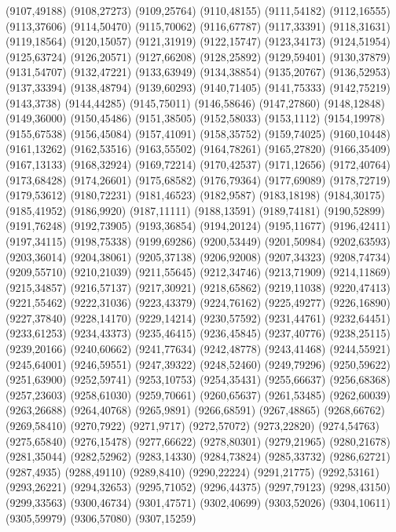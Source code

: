 (9107,49188)
(9108,27273)
(9109,25764)
(9110,48155)
(9111,54182)
(9112,16555)
(9113,37606)
(9114,50470)
(9115,70062)
(9116,67787)
(9117,33391)
(9118,31631)
(9119,18564)
(9120,15057)
(9121,31919)
(9122,15747)
(9123,34173)
(9124,51954)
(9125,63724)
(9126,20571)
(9127,66208)
(9128,25892)
(9129,59401)
(9130,37879)
(9131,54707)
(9132,47221)
(9133,63949)
(9134,38854)
(9135,20767)
(9136,52953)
(9137,33394)
(9138,48794)
(9139,60293)
(9140,71405)
(9141,75333)
(9142,75219)
(9143,3738)
(9144,44285)
(9145,75011)
(9146,58646)
(9147,27860)
(9148,12848)
(9149,36000)
(9150,45486)
(9151,38505)
(9152,58033)
(9153,1112)
(9154,19978)
(9155,67538)
(9156,45084)
(9157,41091)
(9158,35752)
(9159,74025)
(9160,10448)
(9161,13262)
(9162,53516)
(9163,55502)
(9164,78261)
(9165,27820)
(9166,35409)
(9167,13133)
(9168,32924)
(9169,72214)
(9170,42537)
(9171,12656)
(9172,40764)
(9173,68428)
(9174,26601)
(9175,68582)
(9176,79364)
(9177,69089)
(9178,72719)
(9179,53612)
(9180,72231)
(9181,46523)
(9182,9587)
(9183,18198)
(9184,30175)
(9185,41952)
(9186,9920)
(9187,11111)
(9188,13591)
(9189,74181)
(9190,52899)
(9191,76248)
(9192,73905)
(9193,36854)
(9194,20124)
(9195,11677)
(9196,42411)
(9197,34115)
(9198,75338)
(9199,69286)
(9200,53449)
(9201,50984)
(9202,63593)
(9203,36014)
(9204,38061)
(9205,37138)
(9206,92008)
(9207,34323)
(9208,74734)
(9209,55710)
(9210,21039)
(9211,55645)
(9212,34746)
(9213,71909)
(9214,11869)
(9215,34857)
(9216,57137)
(9217,30921)
(9218,65862)
(9219,11038)
(9220,47413)
(9221,55462)
(9222,31036)
(9223,43379)
(9224,76162)
(9225,49277)
(9226,16890)
(9227,37840)
(9228,14170)
(9229,14214)
(9230,57592)
(9231,44761)
(9232,64451)
(9233,61253)
(9234,43373)
(9235,46415)
(9236,45845)
(9237,40776)
(9238,25115)
(9239,20166)
(9240,60662)
(9241,77634)
(9242,48778)
(9243,41468)
(9244,55921)
(9245,64001)
(9246,59551)
(9247,39322)
(9248,52460)
(9249,79296)
(9250,59622)
(9251,63900)
(9252,59741)
(9253,10753)
(9254,35431)
(9255,66637)
(9256,68368)
(9257,23603)
(9258,61030)
(9259,70661)
(9260,65637)
(9261,53485)
(9262,60039)
(9263,26688)
(9264,40768)
(9265,9891)
(9266,68591)
(9267,48865)
(9268,66762)
(9269,58410)
(9270,7922)
(9271,9717)
(9272,57072)
(9273,22820)
(9274,54763)
(9275,65840)
(9276,15478)
(9277,66622)
(9278,80301)
(9279,21965)
(9280,21678)
(9281,35044)
(9282,52962)
(9283,14330)
(9284,73824)
(9285,33732)
(9286,62721)
(9287,4935)
(9288,49110)
(9289,8410)
(9290,22224)
(9291,21775)
(9292,53161)
(9293,26221)
(9294,32653)
(9295,71052)
(9296,44375)
(9297,79123)
(9298,43150)
(9299,33563)
(9300,46734)
(9301,47571)
(9302,40699)
(9303,52026)
(9304,10611)
(9305,59979)
(9306,57080)
(9307,15259)
